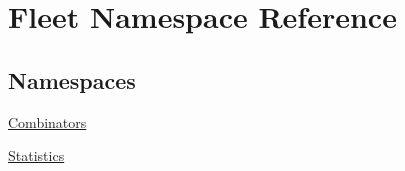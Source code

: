 \hypertarget{namespace_fleet}{}\section{Fleet Namespace Reference}
\label{namespace_fleet}
\subsection*{Namespaces}
\begin{DoxyCompactItemize}
\item 
 \hyperlink{namespace_fleet_1_1_combinators}{Combinators}
\item 
 \hyperlink{namespace_fleet_1_1_statistics}{Statistics}
\end{DoxyCompactItemize}
